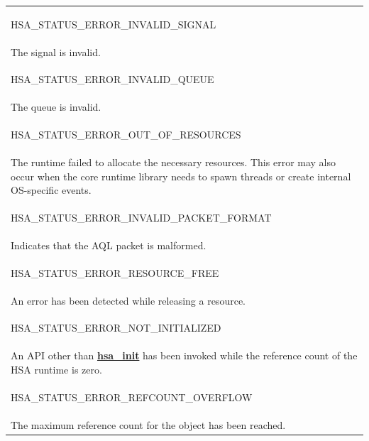 \documentclass[final]{book}
\newcommand{\reffun}[1]{\textbf{#1}}
\newcommand{\reftyp}[1]{#1}
\newcommand{\refenu}[1]{\reftyp{#1}}
\begin{document}
\begin{longtable}{@{\hspace{2em}}p{\linewidth-2em}}
\hspace{-2em}\hypertarget{group__status_1ggad755322e7ff95456520e8abdbe90d225a7b4c8c0d4c99a1fe966abc2d39b575fe}{\refenu{HSA_\-STATUS_\-ERROR_\-INVALID_\-SIGNAL}} \\The signal is invalid.\\[2mm]
\hspace{-2em}\hypertarget{group__status_1ggad755322e7ff95456520e8abdbe90d225aa3c762eb6a61b358702b45259d1686c4}{\refenu{HSA_\-STATUS_\-ERROR_\-INVALID_\-QUEUE}} \\The queue is invalid.\\[2mm]
\hspace{-2em}\hypertarget{group__status_1ggad755322e7ff95456520e8abdbe90d225a1a77fcf36d0d140874c4361ab093eff7}{\refenu{HSA_\-STATUS_\-ERROR_\-OUT_\-OF_\-RESOURCES}} \\The runtime failed to allocate the necessary resources. This error may also occur when the core runtime library needs to spawn threads or create internal OS-specific events.\\[2mm]
\hspace{-2em}\hypertarget{group__status_1ggad755322e7ff95456520e8abdbe90d225a3fad45f72111eb99de5d8daef26c372c}{\refenu{HSA_\-STATUS_\-ERROR_\-INVALID_\-PACKET_\-FORMAT}} \\Indicates that the AQL packet is malformed.\\[2mm]
\hspace{-2em}\hypertarget{group__status_1ggad755322e7ff95456520e8abdbe90d225a6406af88203fcbec4179fbb71cc66b65}{\refenu{HSA_\-STATUS_\-ERROR_\-RESOURCE_\-FREE}} \\An error has been detected while releasing a resource.\\[2mm]
\hspace{-2em}\hypertarget{group__status_1ggad755322e7ff95456520e8abdbe90d225a34ea59ade5bfce95eee935238a99f5b5}{\refenu{HSA_\-STATUS_\-ERROR_\-NOT_\-INITIALIZED}} \\An API other than \hyperlink{group__initshutdown_1ga5b8574433e7dbcbd31ea397a02e3c32b}{\reffun{hsa_\-init}} has been invoked while the reference count of the HSA runtime is zero.\\[2mm]
\hspace{-2em}\hypertarget{group__status_1ggad755322e7ff95456520e8abdbe90d225aa9218eed04d1d2ffc5ed8f33f2cd1c9b}{\refenu{HSA_\-STATUS_\-ERROR_\-REFCOUNT_\-OVERFLOW}} \\The maximum reference count for the object has been reached.\\[2mm]

\end{longtable}
\end{document}
